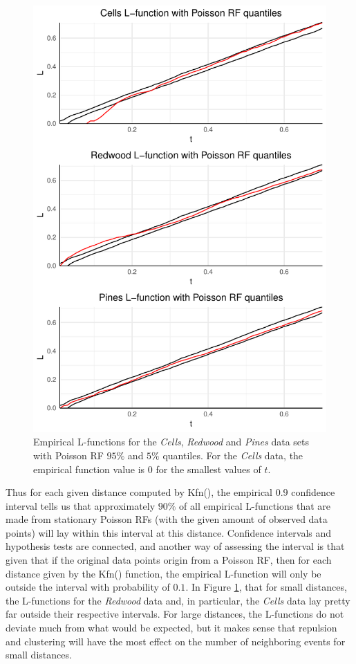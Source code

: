 \begin{figure}
    \centering
    \includegraphics[scale=0.95]{figures/prob1_quantiles.pdf}
    \caption{Empirical L-functions for the \textit{Cells}, \textit{Redwood} and \textit{Pines} data sets with Poisson RF $95\%$ and $5\%$ quantiles. For the \textit{Cells} data, the empirical function value is $0$ for the smallest values of $t$.}
    \label{fig:poiss_quantiles}
\end{figure}

Thus for each given distance computed by Kfn(), the empirical $0.9$ confidence interval tells us that approximately $90\%$ of all empirical L-functions that are made from stationary Poisson RFs (with the given amount of observed data points) will lay within this interval at this distance. Confidence intervals and hypothesis tests are connected, and another way of assessing the interval is that given that if the original data points origin from a Poisson RF, then for each distance given by the Kfn() function, the empirical L-function will only be outside the interval with probability of $0.1$. In Figure \ref{fig:poiss_quantiles}, that for small distances, the L-functions for the \textit{Redwood} data and, in particular, the \textit{Cells} data lay pretty far outside their respective intervals. For large distances, the L-functions do not deviate much from what would be expected, but it makes sense that repulsion and clustering will have the most effect on the number of neighboring events for small distances.

